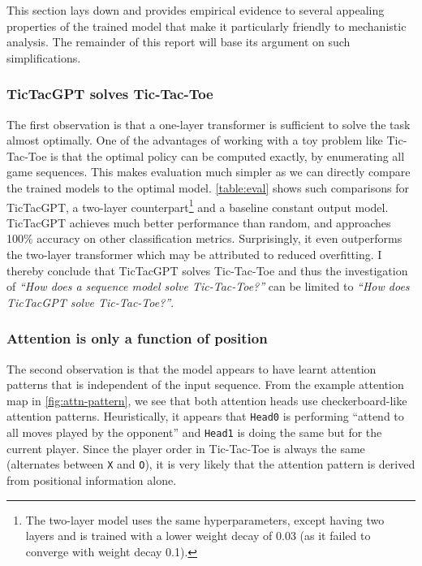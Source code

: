 \documentclass{article}
\newcommand{\ttgpt}{TicTacGPT\xspace}
\newcommand{\ttt}{Tic-Tac-Toe\xspace}
\newcounter{num}
\begin{document}


This section lays down and provides empirical evidence to several appealing properties of the trained model that make it particularly friendly to mechanistic analysis. The remainder of this report will base its argument on such simplifications.

\subsubsection{\ttgpt solves \ttt}

The first observation is that a one-layer transformer is sufficient to solve the task almost optimally. One of the advantages of working with a toy problem like \ttt is that the optimal policy can be computed exactly, by enumerating all game sequences. This makes evaluation much simpler as we can directly compare the trained models to the optimal model. \cref{table:eval} shows such comparisons for \ttgpt, a two-layer counterpart\footnote{The two-layer model uses the same hyperparameters, except having two layers and is trained with a lower weight decay of 0.03 (as it failed to converge with weight decay 0.1).} and a baseline constant output model. \ttgpt achieves much better performance than random, and approaches 100\% accuracy on other classification metrics. Surprisingly, it even outperforms the two-layer transformer which may be attributed to reduced overfitting. I thereby conclude that \ttgpt solves \ttt and thus the investigation of \emph{``How does a sequence model solve \ttt?''} can be limited to \emph{``How does \ttgpt solve \ttt?''}.

\subsubsection{Attention is only a function of position}



The second observation is that the model appears to have learnt attention patterns that is independent of the input sequence. From the example attention map in \cref{fig:attn-pattern}, we see that both attention heads use checkerboard-like attention patterns. Heuristically, it appears that \texttt{Head0} is performing ``attend to all moves played by the opponent'' and \texttt{Head1} is doing the same but for the current player. Since the player order in \ttt is always the same (alternates between \texttt{X} and \texttt{O}), it is very likely that the attention pattern is derived from positional information alone.
\end{document}
